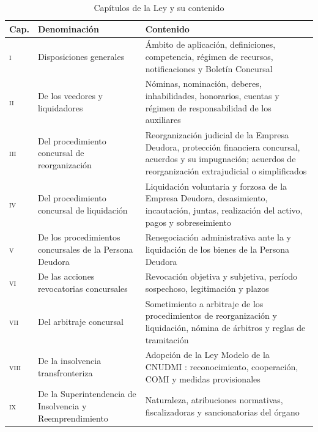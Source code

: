 \begin{table}[htbp]
\centering
\small
\caption{Capítulos de la Ley  y su contenido}
\label{tab:estructura-ley}
\begin{tabularx}{\textwidth}{@{}p{}>{\raggedright\arraybackslash}p{}X@{}}
\toprule
\textbf{Cap.} & \textbf{Denominación} & \textbf{Contenido} \\
\midrule
\textsc{i} & Disposiciones generales
& Ámbito de aplicación, definiciones, competencia, régimen de recursos, notificaciones y
Boletín Concursal \\
\addlinespace
\textsc{ii} & De los veedores y liquidadores
& Nóminas, nominación, deberes, inhabilidades, honorarios, cuentas y régimen de
responsabilidad de los auxiliares \\
\addlinespace
\textsc{iii} & Del procedimiento concursal de reorganización
& Reorganización judicial de la Empresa Deudora, protección financiera concursal,
acuerdos y su impugnación; acuerdos de reorganización extrajudicial o simplificados \\
\addlinespace
\textsc{iv} & Del procedimiento concursal de liquidación
& Liquidación voluntaria y forzosa de la Empresa Deudora, desasimiento, incautación,
juntas, realización del activo, pagos y sobreseimiento \\
\addlinespace
\textsc{v} & De los procedimientos concursales de la Persona Deudora
& Renegociación administrativa ante la \superir{} y liquidación de los bienes de la
Persona Deudora \\
\addlinespace
\textsc{vi} & De las acciones revocatorias concursales
& Revocación objetiva y subjetiva, período sospechoso, legitimación y plazos \\
\addlinespace
\textsc{vii} & Del arbitraje concursal
& Sometimiento a arbitraje de los procedimientos de reorganización y liquidación,
nómina de árbitros y reglas de tramitación \\
\addlinespace
\textsc{viii} & De la insolvencia transfronteriza
& Adopción de la Ley Modelo de la CNUDMI \parencite{ley-modelo-uncitral}: reconocimiento,
cooperación, COMI y medidas provisionales \\
\addlinespace
\textsc{ix} & De la Superintendencia de Insolvencia y Reemprendimiento
& Naturaleza, atribuciones normativas, fiscalizadoras y sancionatorias del órgano \\
\bottomrule
\end{tabularx}
\end{table}

